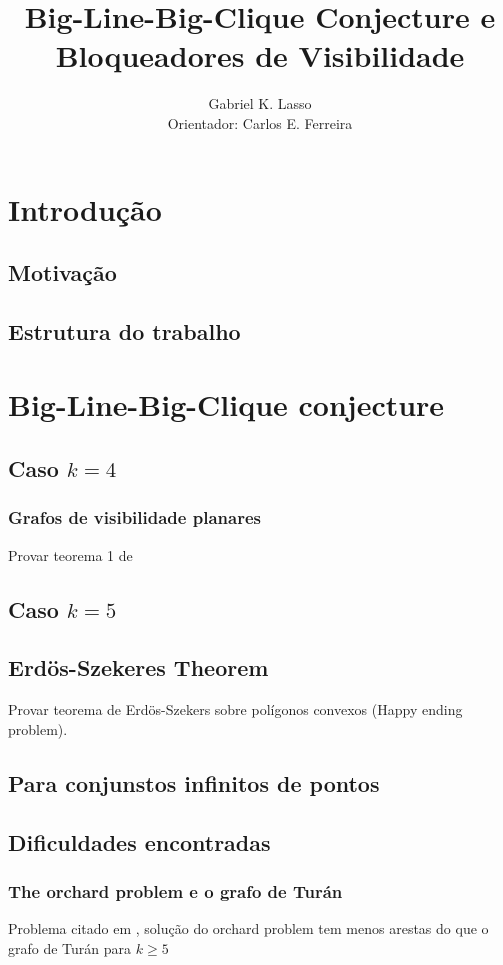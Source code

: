 \documentclass[a4paper]{book}
\title{\textbf{Big-Line-Big-Clique Conjecture e Bloqueadores de Visibilidade}}
\author{Gabriel K. Lasso\\ Orientador: Carlos E. Ferreira}
\date{}
\begin{document}
\maketitle
\tableofcontents
\chapter{Introdução}

\section{Motivação}

\section{Estrutura do trabalho}

\chapter{Big-Line-Big-Clique conjecture}

\section{Caso $k=4$}
\subsection{Grafos de visibilidade planares}
Provar teorema 1 de \cite{planar}
\cite{visibilitygraph}
\section{Caso $k=5$}
\section{Erdös-Szekeres Theorem}
Provar teorema de Erdös-Szekers sobre polígonos convexos (Happy ending problem).
\cite{pentagon}
\section{Para conjunstos infinitos de pontos}
\cite{infinity}
\section{Dificuldades encontradas}
\subsection{The orchard problem e o grafo de Turán}
Problema citado em \cite{visblock}, solução do orchard problem tem menos arestas do que o grafo de Turán para $k\geq 5$
\end{document}
